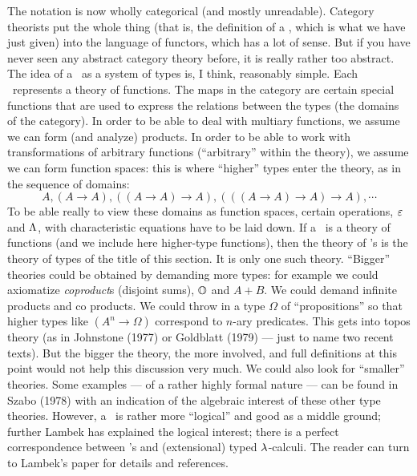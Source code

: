 The notation is now wholly categorical (and mostly unreadable). Category theorists put the whole thing (that is, the definition of a \ccc, which is what we have just given) into the language of functors, which has a lot of sense. But if you have never seen any abstract category theory before, it is really rather too abstract. The idea of a \ccc\ as a system of types is, I think, reasonably simple. Each \ccc\ represents a theory of functions. The maps in the category are certain special functions that are used to express the relations between the types (the domains of the category). In order to
be able to deal with multiary functions, we assume we can form
(and analyze) products. In order to be able to work with transformations of arbitrary functions (``arbitrary'' within the theory), we assume we can form function spaces: this is where ``higher'' types enter the theory, as in the sequence of domains:
$$
A, (A \to A), ((A \to A) \to A), (((A \to A) \to A) \to A), \cdots
$$
To be able really to view these domains as function spaces, certain operations, $\varepsilon$ and $\Lambda$, with characteristic equations have to be laid down.
If a \ccc\ is a theory of functions (and we include here higher-type functions), then the theory of \ccc's is the theory of types of the title of this section. It is only one such theory. ``Bigger'' theories could be obtained by demanding more types: for example we could axiomatize {\it coproduct}s (disjoint sums), ${\mathbb O}$ and $A+ B$. We could demand infinite products and co products. We could throw in a type $\Omega$ of ``propositions'' so that higher types like $(A^n \to \Omega)$ correspond to $n$-ary predicates. This gets into topos theory (as in Johnstone (1977) or Goldblatt (1979) --- just to name two recent texts). But the bigger the theory, the more involved, and full definitions at this point would not help this discussion very much.
We could also look for ``smaller'' theories. Some examples --- of a rather highly formal nature --- can be found in Szabo (1978) with an indication of the algebraic interest of these other type theories. However, a \ccc\ is rather more ``logical'' and good as a middle ground; further Lambek has explained the logical interest; there is a perfect correspondence between \ccc's and (extensional) typed $\lambda$-calculi. The reader can turn to Lambek's paper for details and references.

\def\means#1{\llbracket\, #1 \,\rrbracket}

